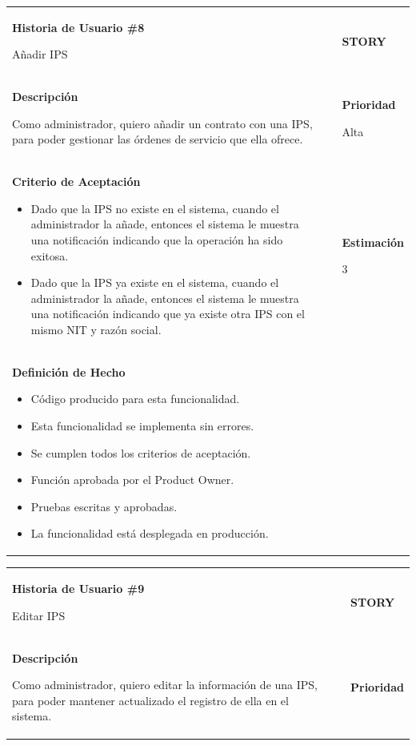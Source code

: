 \documentclass[12pt,a4paper]{article}
\begin{document}
\begin{center}
\begin{tabular}{| p{10cm} c p{2.5cm}|}
\hline 
\textbf{Historia de Usuario \#8}

Añadir IPS & & \textbf{{\Large STORY}} \\ 
\textbf{Descripción}

Como administrador, quiero añadir un contrato con una IPS, para poder
gestionar las órdenes de servicio que ella ofrece. &  & \textbf{Prioridad}

Alta\\

\textbf{Criterio de Aceptación}

\begin{itemize}
\item Dado que la IPS no existe en el sistema, cuando el administrador
la añade, entonces el sistema le muestra una notificación
indicando que la operación ha sido exitosa.
\item Dado que la IPS ya existe en el sistema, cuando el administrador
la añade, entonces el sistema le muestra una notificación
indicando que ya existe otra IPS con el mismo NIT y razón social.
\end{itemize} & & \textbf{Estimación}

3 \\ 

\textbf{Definición de Hecho}

\begin{itemize}
\item Código producido para esta funcionalidad.
\item Esta funcionalidad se implementa sin errores.
\item Se cumplen todos los criterios de aceptación.
\item Función aprobada por el Product Owner.
\item Pruebas escritas y aprobadas.
\item La funcionalidad está desplegada en producción.
\end{itemize} & & \\
\hline  
\end{tabular}
\vspace{5mm}

\begin{tabular}{| p{10cm} c p{2.5cm}|}
\hline 
\textbf{Historia de Usuario \#9}

Editar IPS & & \textbf{{\Large STORY}} \\ 
\textbf{Descripción}

Como administrador, quiero editar la información de una IPS, para poder
mantener actualizado el registro de ella en el sistema. &  & \textbf{Prioridad}


\end{tabular}
\end{center}
\end{document}
